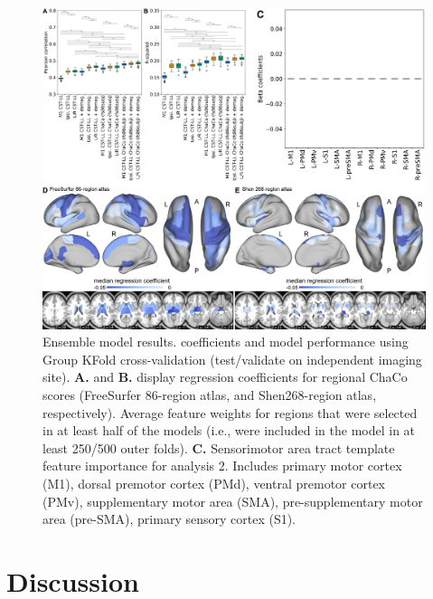 \documentclass[10pt]{article}
\begin{document}
\begin{figure}[htp]
\centering
\includegraphics[width=1\linewidth]{figures/Analysis2.png}
\caption{Ensemble model results. coefficients and model performance using Group KFold cross-validation (test/validate on independent imaging site). \textbf{A.} and \textbf{B.} display regression coefficients for regional ChaCo scores (FreeSurfer 86-region atlas, and Shen268-region atlas, respectively). Average feature weights for regions that were selected in at least half of the models (i.e., were included in the model in at least 250/500 outer folds). \textbf{C.} Sensorimotor area tract template feature importance for analysis 2. Includes primary motor cortex (M1), dorsal premotor cortex (PMd), ventral premotor cortex (PMv), supplementary motor area (SMA), pre-supplementary motor area (pre-SMA), primary sensory cortex (S1).}
\label{nemotool}
\end{figure}





\section{Discussion}

\clearpage

\newcommand{\beginsupplement}{%
\setcounter{table}{0}
\renewcommand{\thetable}{S\arabic{table}}%
\setcounter{figure}{0}
\renewcommand{\thefigure}{S\arabic{figure}}%
}

\printbibliography
\end{document}
